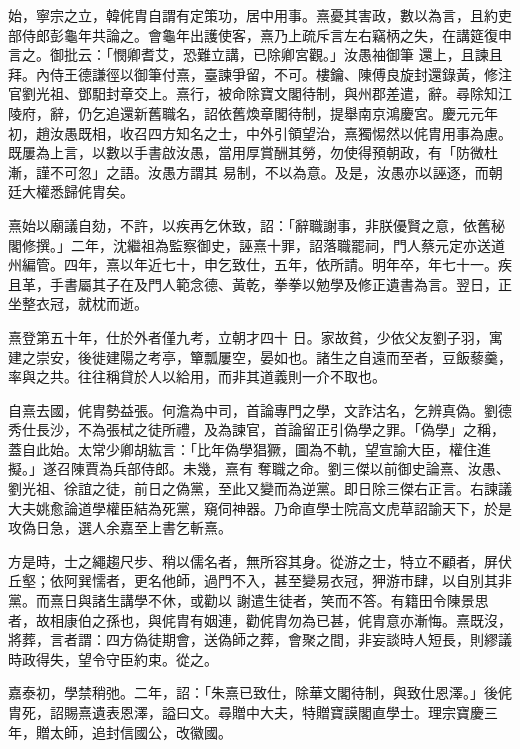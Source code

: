 \begin{pinyinscope}
 始，寧宗之立，韓侂胄自謂有定策功，居中用事。熹憂其害政，數以為言，且約吏部侍郎彭龜年共論之。會龜年出護使客，熹乃上疏斥言左右竊柄之失，在講筵復申言之。御批云：「憫卿耆艾，恐難立講，已除卿宮觀。」汝愚袖御筆
 還上，且諫且拜。內侍王德謙徑以御筆付熹，臺諫爭留，不可。樓鑰、陳傅良旋封還錄黃，修注官劉光祖、鄧馹封章交上。熹行，被命除寶文閣待制，與州郡差遣，辭。尋除知江陵府，辭，仍乞追還新舊職名，詔依舊煥章閣待制，提舉南京鴻慶宮。慶元元年初，趙汝愚既相，收召四方知名之士，中外引領望治，熹獨惕然以侂胄用事為慮。既屢為上言，以數以手書啟汝愚，當用厚賞酬其勞，勿使得預朝政，有「防微杜漸，謹不可忽」之語。汝愚方謂其
 易制，不以為意。及是，汝愚亦以誣逐，而朝廷大權悉歸侂胄矣。



 熹始以廟議自劾，不許，以疾再乞休致，詔：「辭職謝事，非朕優賢之意，依舊秘閣修撰。」二年，沈繼祖為監察御史，誣熹十罪，詔落職罷祠，門人蔡元定亦送道州編管。四年，熹以年近七十，申乞致仕，五年，依所請。明年卒，年七十一。疾且革，手書屬其子在及門人範念德、黃乾，拳拳以勉學及修正遺書為言。翌日，正坐整衣冠，就枕而逝。



 熹登第五十年，仕於外者僅九考，立朝才四十
 日。家故貧，少依父友劉子羽，寓建之崇安，後徙建陽之考亭，簞瓢屢空，晏如也。諸生之自遠而至者，豆飯藜羹，率與之共。往往稱貸於人以給用，而非其道義則一介不取也。



 自熹去國，侂胄勢益張。何澹為中司，首論專門之學，文詐沽名，乞辨真偽。劉德秀仕長沙，不為張栻之徒所禮，及為諫官，首論留正引偽學之罪。「偽學」之稱，蓋自此始。太常少卿胡紘言：「比年偽學猖獗，圖為不軌，望宣諭大臣，權住進擬。」遂召陳賈為兵部侍郎。未幾，熹有
 奪職之命。劉三傑以前御史論熹、汝愚、劉光祖、徐誼之徒，前日之偽黨，至此又變而為逆黨。即日除三傑右正言。右諫議大夫姚愈論道學權臣結為死黨，窺伺神器。乃命直學士院高文虎草詔諭天下，於是攻偽日急，選人余嘉至上書乞斬熹。



 方是時，士之繩趨尺步、稍以儒名者，無所容其身。從游之士，特立不顧者，屏伏丘壑；依阿巽懦者，更名他師，過門不入，甚至變易衣冠，狎游市肆，以自別其非黨。而熹日與諸生講學不休，或勸以
 謝遣生徒者，笑而不答。有籍田令陳景思者，故相康伯之孫也，與侂胄有姻連，勸侂胄勿為已甚，侂胄意亦漸悔。熹既沒，將葬，言者謂：四方偽徒期會，送偽師之葬，會聚之間，非妄談時人短長，則繆議時政得失，望令守臣約束。從之。



 嘉泰初，學禁稍弛。二年，詔：「朱熹已致仕，除華文閣待制，與致仕恩澤。」後侂胄死，詔賜熹遺表恩澤，謚曰文。尋贈中大夫，特贈寶謨閣直學士。理宗寶慶三年，贈太師，追封信國公，改徽國。




\end{pinyinscope}

